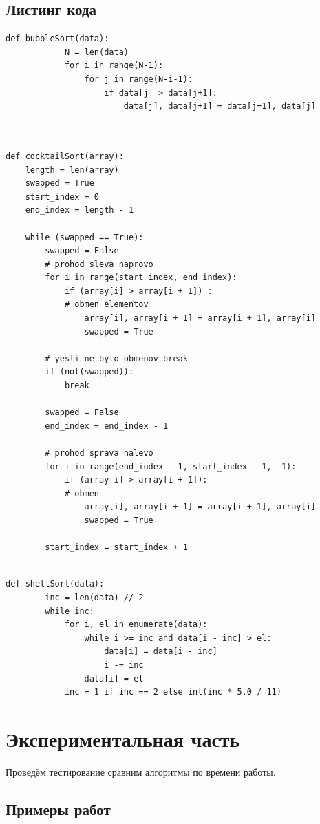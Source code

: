\documentclass[a4paper]{article}
\begin{document}
	\subsection{Листинг кода}
	
	\begin{lstlisting}[label = bubble, caption = Сортировка пузырьком]
		def bubbleSort(data):
			N = len(data)
			for i in range(N-1):
				for j in range(N-i-1):
					if data[j] > data[j+1]:
						data[j], data[j+1] = data[j+1], data[j]
		
		
	\end{lstlisting}

	
	\begin{lstlisting}[label = shaker, caption = Шейкер-сортировка]
def cocktailSort(array): 
	length = len(array) 
	swapped = True
	start_index = 0
	end_index = length - 1
	
	while (swapped == True): 
		swapped = False
		# prohod sleva naprovo
		for i in range(start_index, end_index): 
			if (array[i] > array[i + 1]) : 
			# obmen elementov
				array[i], array[i + 1] = array[i + 1], array[i] 
				swapped = True
	
		# yesli ne bylo obmenov break
		if (not(swapped)): 
			break
	
		swapped = False
		end_index = end_index - 1
	
		# prohod sprava nalevo
		for i in range(end_index - 1, start_index - 1, -1): 
			if (array[i] > array[i + 1]): 
			# obmen
				array[i], array[i + 1] = array[i + 1], array[i] 
				swapped = True
	
		start_index = start_index + 1
	
	\end{lstlisting}


	\begin{lstlisting}[label = shell, caption = Сортировка Шелла]
	def shellSort(data):
		inc = len(data) // 2
		while inc:
			for i, el in enumerate(data):
				while i >= inc and data[i - inc] > el:
					data[i] = data[i - inc]
					i -= inc
				data[i] = el
			inc = 1 if inc == 2 else int(inc * 5.0 / 11)
	\end{lstlisting}
	\clearpage
	\section{Экспериментальная часть}
	Проведём тестирование сравним алгоритмы по времени работы.
	
	\subsection{Примеры работ}
	
\end{document}
